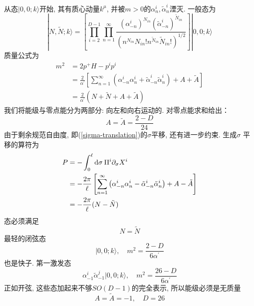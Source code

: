 从态$|0,0;k \rangle$开始, 其有质心动量$k^\mu$, 并被$m>0$的$\alpha_{n}^{i}, \tilde{\alpha}_{n}^{i}$湮灭. 一般态为
\begin{equation}
|N, \tilde{N} ; k\rangle=\left[
    \prod_{i=2}^{D-1} \prod_{n=1}^{\infty} \frac{(\alpha_{-n}^{i})^{N_{i n}}(\tilde{\alpha}_{-n}^{i})^{\tilde{N}_{i n}}}{(n^{N_{i n}} N_{i n}! n^{\tilde{N}_{i n}} \tilde{N}_{i n}!)^{1 / 2}}
\right] |0,0 ; k\rangle
\end{equation}
质量公式为
\begin{equation}
\begin{aligned}
m^{2} &=2 p^{+} H-p^{i} p^{i} \\
&=\frac{2}{\alpha^{\prime}}\left[\sum_{n=1}^{\infty}\left(\alpha_{-n}^{i} \alpha_{n}^{i}+\tilde{\alpha}_{-n}^{i} \tilde{\alpha}_{n}^{i}\right)+A+\tilde{A}\right] \\
&=\frac{2}{\alpha^{\prime}}(N+\tilde{N}+A+\tilde{A})
\end{aligned}
\end{equation}
我们将能级与零点能分为两部分: 向左和向右运动的. 对零点能求和给出：
\begin{equation}
A=\tilde{A}=\frac{2-D}{24}
\end{equation}
由于剩余规范自由度, 即(\ref{sigma-translation})的$\sigma$平移, 还有进一步约束. 生成$\sigma$ 平移的算符为
\begin{equation}
\begin{aligned}
P &=-\int_{0}^{\ell} \mathrm{d} \sigma \:\Pi^{i} \partial_{\sigma} X^{i} \\
&=-\frac{2 \pi}{\ell}\left[\sum_{n=1}^{\infty}\left(\alpha_{-n}^{i} \alpha_{n}^{i}-\tilde{\alpha}_{-n}^{i} \tilde{\alpha}_{n}^{i}\right)+A-\tilde{A}\right] \\
&=-\frac{2 \pi}{\ell}(N-\tilde{N})
\end{aligned}
\end{equation}
态必须满足
\begin{equation}
N=\tilde{N}
\end{equation}
最轻的闭弦态
\begin{equation}
|0,0 ; k\rangle, \quad m^{2}=\frac{2-D}{6 \alpha^{\prime}}
\end{equation}
也是快子. 第一激发态
\begin{equation}
\alpha_{-1}^{i} \tilde{\alpha}_{-1}^{j}|0,0 ; k\rangle, \quad m^{2}=\frac{26-D}{6 \alpha^{\prime}} \label{1-excited-state}
\end{equation}
正如开弦, 这些态加起来不够$SO(D-1)$的完全表示, 所以能级必须是无质量
\begin{equation}
A=\tilde{A}=-1, \quad D=26
\end{equation}
